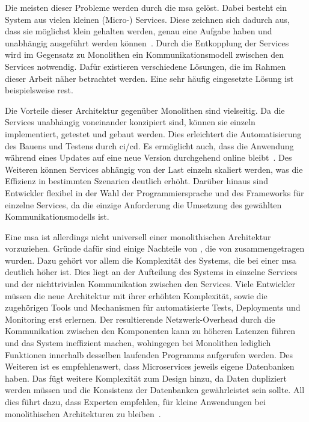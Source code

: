 Die meisten dieser Probleme werden durch die \acrlong{msa} gelöst.
Dabei besteht ein System aus vielen kleinen (Micro-) Services.
Diese zeichnen sich dadurch aus, dass sie möglichst klein gehalten werden, genau eine Aufgabe haben und unabhängig ausgeführt werden können~\cite{a-survey-on}.
Durch die Entkopplung der Services wird im Gegensatz zu Monolithen ein Kommunikationsmodell zwischen den Services notwendig.
Dafür existieren verschiedene Lösungen, die im Rahmen dieser Arbeit näher betrachtet werden.
Eine sehr häufig eingesetzte Lösung ist beispielsweise \gls{rest}.

Die Vorteile dieser Architektur gegenüber Monolithen sind vielseitig.
Da die Services unabhängig voneinander konzipiert sind, können sie einzeln implementiert, getestet und gebaut werden.
Dies erleichtert die Automatisierung des Bauens und Testens durch \gls{ci}/\gls{cd}.
Es ermöglicht auch, dass die Anwendung während eines Updates auf eine neue Version durchgehend online bleibt~\cite{a-survey-on}.
Des Weiteren können Services abhängig von der Last einzeln skaliert werden, was die Effizienz in bestimmten Szenarien deutlich erhöht.
Darüber hinaus sind Entwickler flexibel in der Wahl der Programmiersprache und des Frameworks für einzelne Services, da die einzige Anforderung die Umsetzung des gewählten Kommunikationsmodells ist.

Eine \acrlong{msa} ist allerdings nicht universell einer monolithischen Architektur vorzuziehen.
Gründe dafür sind einige Nachteile von , die von  zusammengetragen wurden.
Dazu gehört vor allem die Komplexität des Systems, die bei einer \acrlong{msa} deutlich höher ist.
Dies liegt an der Aufteilung des Systems in einzelne Services und der nichttrivialen Kommunikation zwischen den Services.
Viele Entwickler müssen die neue Architektur mit ihrer erhöhten Komplexität, sowie die zugehörigen Tools und Mechanismen für automatisierte Tests, Deployments und Monitoring erst erlernen.
Der resultierende Netzwerk-Overhead durch die Kommunikation zwischen den Komponenten kann zu höheren Latenzen führen und das System ineffizient machen, wohingegen bei Monolithen lediglich Funktionen innerhalb desselben laufenden Programms aufgerufen werden.
Des Weiteren ist es empfehlenswert, dass Microservices jeweils eigene Datenbanken haben.
Das fügt weitere Komplexität zum Design hinzu, da Daten dupliziert werden müssen und die Konsistenz der Datenbanken gewährleistet sein sollte.
All dies führt dazu, dass Experten empfehlen, für kleine Anwendungen bei monolithischen Architekturen zu bleiben~\cite{a-survey-on,7742218}.

